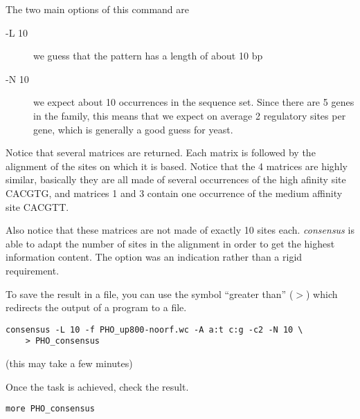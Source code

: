 The two main options of this command are 

\begin{description}
\item[-L 10] we guess that the pattern has a length of about 10 bp

\item[-N 10] we expect about 10 occurrences in the sequence set. Since
there are 5 genes in the family, this means that we expect on average
2 regulatory sites per gene, which is generally a good guess for
yeast.

\end{description}

Notice that several matrices are returned. Each matrix is followed by
the alignment of the sites on which it is based. Notice that the 4
matrices are highly similar, basically they are all made of several
occurrences of the high afinity site CACGTG, and matrices 1 and 3
contain one occurrence of the medium affinity site CACGTT. 

Also notice that these matrices are not made of exactly 10 sites
each. \textit{consensus} is able to adapt the number of sites in the
alignment in order to get the highest information content. The option
 was an indication rather than a rigid requirement.

To save the result in a file, you can use the symbol ``greater than''
($>$) which redirects the output of a program to a file.

{\color{Blue} \begin{footnotesize} 
\begin{verbatim}
consensus -L 10 -f PHO_up800-noorf.wc -A a:t c:g -c2 -N 10 \
    > PHO_consensus
\end{verbatim} \end{footnotesize}
}


(this may take a few minutes)

Once the task is achieved, check the result.

{\color{Blue} \begin{footnotesize} 
\begin{verbatim}
more PHO_consensus
\end{verbatim} \end{footnotesize}
}

